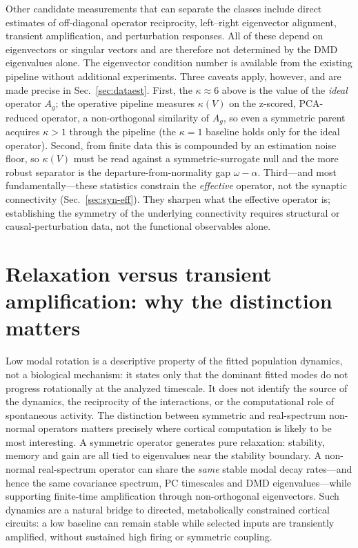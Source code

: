 \documentclass[11pt]{article}
\begin{document}
Other candidate measurements that can separate the classes include direct
estimates of off-diagonal operator reciprocity, left--right eigenvector
alignment, transient amplification, and perturbation responses. All of these
depend on eigenvectors or singular vectors and are therefore not determined by
the DMD eigenvalues alone. The eigenvector condition number is available from the
existing pipeline without additional experiments. Three caveats apply, however,
and are made precise in Sec.~\ref{sec:dataest}. First, the $\kappa\approx6$ above
is the value of the \emph{ideal} operator $A_g$; the operative pipeline measures
$\kappa(V)$ on the z-scored, PCA-reduced operator, a non-orthogonal similarity of
$A_g$, so even a symmetric parent acquires $\kappa>1$ through the pipeline (the
$\kappa{=}1$ baseline holds only for the ideal operator). Second, from finite
data this is compounded by an estimation noise floor, so $\kappa(V)$ must be read
against a symmetric-surrogate null and the more robust separator is the
departure-from-normality gap $\omega-\alpha$. Third---and most
fundamentally---these statistics constrain the \emph{effective} operator, not the
synaptic connectivity (Sec.~\ref{sec:syn-eff}). They sharpen what the effective
operator is; establishing the symmetry of the underlying connectivity requires
structural or causal-perturbation data, not the functional observables alone.

\section{Relaxation versus transient amplification: why the distinction matters}
\label{sec:relax-amp}
Low modal rotation is a descriptive property of the fitted population dynamics,
not a biological mechanism: it states only that the dominant fitted modes do not
progress rotationally at the analyzed timescale. It does not identify the source
of the dynamics, the reciprocity of the interactions, or the computational role
of spontaneous activity. The distinction between symmetric and real-spectrum
non-normal operators matters precisely where cortical computation is likely to
be most interesting. A symmetric operator generates pure relaxation: stability,
memory and gain are all tied to eigenvalues near the stability boundary. A
non-normal real-spectrum operator can share the \emph{same} stable modal decay
rates---and hence the same covariance spectrum, PC timescales and DMD
eigenvalues---while supporting finite-time amplification through non-orthogonal
eigenvectors\cite{murphy2009,goldman2009,hennequin2014,bondanelli2020}. Such
dynamics are a natural bridge to directed, metabolically constrained cortical
circuits: a low baseline can remain stable while selected inputs are transiently
amplified, without sustained high firing or symmetric coupling.
\end{document}

